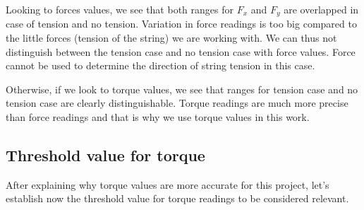 Looking to forces values, we see that both ranges for $F_{x}$ and $F_{y}$ are overlapped in case of tension and no tension. Variation in force readings is too big compared to the little forces (tension of the string) we are working with. We can thus not distinguish between the tension case and no tension case with force values. Force cannot be used to determine the direction of string tension in this case.

Otherwise, if we look to torque values, we see that ranges for tension case and no tension case are clearly distinguishable. Torque readings are much more precise than force readings and that is why we use torque values in this work.

\subsection{Threshold value for torque}
After explaining why torque values are more accurate for this project, let's establish now the threshold value for torque readings to be considered relevant. 


